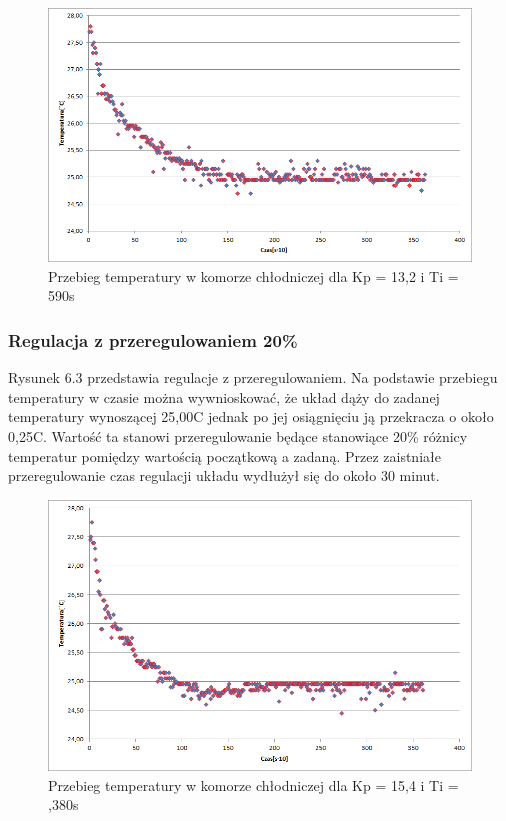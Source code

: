 \documentclass[oneside]{mgr}
\begin{document}
\begin{center}
\begin{figure}[h!]
    \centering
    \includegraphics[width=\textwidth]{ZN11.png}
    \caption{Przebieg temperatury w komorze chłodniczej dla Kp = 13,2 i Ti = 590s}
    \end{figure}
\end{center}

\subsubsection{Regulacja z przeregulowaniem 20\%}
Rysunek 6.3 przedstawia regulacje z przeregulowaniem. Na podstawie przebiegu temperatury w czasie można wywnioskować, że układ dąży do zadanej temperatury wynoszącej 25,00\textdegree{}C jednak po jej osiągnięciu ją przekracza o około 0,25\textdegree{}C. Wartość ta stanowi przeregulowanie będące stanowiące 20\% różnicy temperatur pomiędzy wartością początkową a zadaną. Przez zaistniałe przeregulowanie czas regulacji układu wydłużył się do około 30 minut.
\begin{center}
\begin{figure}[h!]
    \centering
    \includegraphics[width=\textwidth]{ZN12.png}
    \caption{Przebieg temperatury w komorze chłodniczej dla Kp = 15,4 i Ti = ,380s}
    \end{figure}
\end{center}
\end{document}
